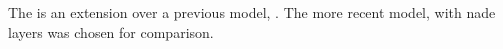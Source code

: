 
The \textcite{micchi2021deep} is an extension over a
previous model, \textcite{micchi2020not}. The more recent
model, with \gls{nade} layers was chosen for comparison.
